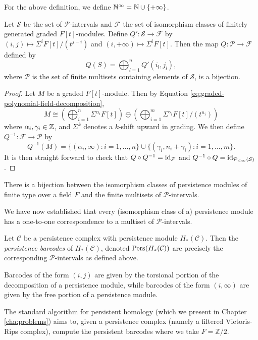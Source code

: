 For the above definition, we define $\mathbb N^\infty = \mathbb N \cup \{+\infty\}$.

\begin{proposition}
    Let $\mathcal S$ be the set of $\mathcal P$-intervals and $\mathcal F$ the set of isomorphism classes of finitely generated graded $F[t]$-modules. Define $Q': \mathcal S \to \mathcal F$ by $(i, j) \mapsto \Sigma^i F[t]/(t^{j-i})$ and $(i, +\infty) \mapsto \Sigma^iF[t]$. Then the map $Q: \mathcal P \to \mathcal F$ defined by
    \[
        Q(S) = \bigoplus_{l=1}^n Q'(i_l, j_l),
    \]
    where $\mathcal P$ is the set of finite multisets containing elements of $\mathcal S$, is a bijection. 
\end{proposition}

\begin{proof}
    Let $M$ be a graded $F[t]$-module. Then by Equation \ref{eq:graded-polynomial-field-decomposition},
    \[ M \cong
        \left(\bigoplus_{i=1}^n \Sigma^{\alpha_i} F[t] \right) \oplus
        \left(\bigoplus_{i=1}^m \Sigma^{\gamma_i} F[t]/(t^{n_i})\right) \]
    where $\alpha_i, \gamma_i \in \mathbb Z$, and $\Sigma^k$ denotes a $k$-shift upward in grading. We then define $Q^{-1}: \mathcal F \to \mathcal P$ by
    \[ Q^{-1}(M) = \{(\alpha_i, \infty): i=1,\ldots,n\} \cup \{(\gamma_i, n_i + \gamma_i): i = 1, \ldots, m\}. \]
    It is then straight forward to check that $Q \circ Q^{-1} = \operatorname{id}_{\mathcal F}$ and $Q^{-1} \circ Q = \operatorname{id}_{\mathcal P_{<\infty}(\mathcal S)}$.
\end{proof}

\begin{corollary}
    There is a bijection between the isomorphism classes of persistence modules of finite type over a field $F$ and the finite multisets of $\mathcal P$-intervals.
\end{corollary}

We have now established that every (isomorphism class of a) persistence module has a one-to-one correspondence to a multiset of $\mathcal P$-intervals.

\begin{definition}
    Let $\mathcal C$ be a persistence complex with persistence module $H_*(\mathcal C)$. Then the \emph{persistence barcodes} of $H_*(\mathcal C)$, denoted $\operatorname{Pers}(H_*(\mathcal C))$ are precisely the corresponding $\mathcal P$-intervals as defined above. 
\end{definition}

Barcodes of the form $(i,j)$ are given by the torsional portion of the decomposition of a persistence module, while barcodes of the form $(i, \infty)$ are given by the free portion of a persistence module.

The standard algorithm for persistent homology (which we present in Chapter \ref{cha:problems}) aims to, given a persistence complex (namely a filtered Vietoris-Rips complex), compute the persistent barcodes where we take $F = \mathbb Z/2$. 
